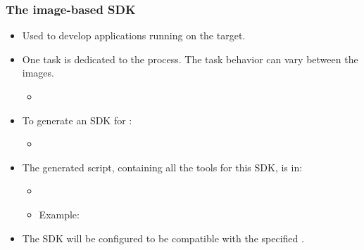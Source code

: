 \begin{frame}
  \frametitle{The image-based SDK}
  \begin{itemize}
    \item Used to develop applications running on the target.
    \item One task is dedicated to the process. The task behavior
      can vary between the images.
      \begin{itemize}
        \item {}
      \end{itemize}
    \item To generate an SDK for :
      \begin{itemize}
        \item {}
      \end{itemize}
    \item The generated script, containing all the tools for this SDK,
      is in:
      \begin{itemize}
        \item {}
        \item Example:
      \end{itemize}
    \item The SDK will be configured to be compatible with the
      specified .
  \end{itemize}
\end{frame}

